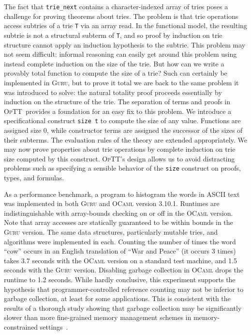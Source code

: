 \documentclass[preprint,natbib]{sigplanconf}
\newcommand{\optt}{\textsc{OpTT}}
\begin{document}
The fact that \texttt{trie\_next} contains a character-indexed array
of tries poses a challenge for proving theorems about tries.  The
problem is that trie operations access subtries of a trie \texttt{T}
via an array read.  In the functional model, the resulting subtrie is
not a structural subterm of \texttt{T}, and so proof by induction on
trie structure cannot apply an induction hypothesis to the subtrie.
This problem may not seem difficult: informal reasoning can easily get
around this problem using instead complete induction on the size of
the trie.  But how can we write a provably total function to compute
the size of a trie?  Such can certainly be implemented in
\textsc{Guru}, but to prove it total we are back to the same problem
it was introduced to solve: the natural totality proof proceeds
essentially by induction on the structure of the trie.  The separation
of terms and proofs in \optt\ provides a foundation for an easy fix to
this problem.  We introduce a specificational construct \texttt{size
t} to compute the size of any value.  Functions are assigned size 0,
while constructor terms are assigned the successor of the sizes of
their subterms.  The evaluation rules of the theory are extended
appropriately.  We may now prove properties about trie operations by
complete induction on trie size computed by this construct.  \optt's
design allows us to avoid distracting problems such as specifying a
sensible behavior of the \texttt{size} construct on proofs, types, and
formulas.

As a performance benchmark, a program to histogram the words in ASCII
text was implemented in both \textsc{Guru} and \textsc{OCaml} version
3.10.1.  Runtimes are indistinguishable with array-bounds checking on
or off in the \textsc{OCaml} version.  Note that array accesses are
statically guaranteed to be within bounds in the \textsc{Guru}
version.  The same data structures, particularly mutable tries, and
algorithms were implemented in each.  Counting the number of times the
word ``cow'' occurs in an English translation of ``War and Peace'' (it
occurs 3 times) takes 3.7 seconds with the \textsc{OCaml} version on a
standard test machine, and 1.5 seconds with the \textsc{Guru} version.
Disabling garbage collection in \textsc{OCaml} drops the runtime to
1.2 seconds.  While hardly conclusive, this experiment supports the
hypothesis that programmer-controlled reference counting may not be
inferior to garbage collection, at least for some applications.  This
is consistent with the results of a thorough study showing that
garbage collection may be significantly slower than more fine-grained
memory management schemes in memory-constrained
settings~\cite{hertz+05}.
\end{document}
